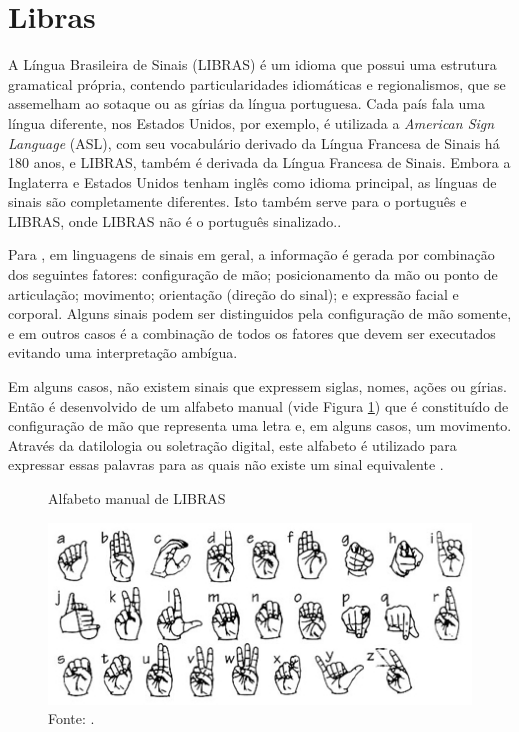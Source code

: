 \section{Libras}

A Língua Brasileira de Sinais (LIBRAS) é um idioma que possui uma estrutura gramatical própria, contendo particularidades 
idiomáticas e regionalismos, que se assemelham ao sotaque ou as gírias da língua portuguesa. Cada país fala uma língua diferente, 
nos Estados Unidos, por exemplo, é utilizada a \textit{American Sign Language} (ASL), com seu vocabulário derivado da Língua 
Francesa de Sinais há 180 anos, e LIBRAS, também é derivada da Língua Francesa de Sinais. Embora a Inglaterra e Estados Unidos tenham inglês como idioma principal, as 
línguas de sinais são completamente diferentes. Isto também serve para o português e LIBRAS, onde LIBRAS não é o português 
sinalizado.\cite{Comunicacao}.

Para , em linguagens de sinais em geral, a informação é gerada por combinação dos seguintes fatores: 
configuração de mão; posicionamento da mão ou ponto de articulação; movimento; orientação (direção do sinal); e expressão facial e 
corporal.
Alguns sinais podem ser distinguidos pela configuração de mão somente, e em outros casos é a combinação de todos os fatores que 
devem ser executados evitando uma interpretação ambígua.

Em alguns casos, não existem sinais que expressem siglas, nomes, ações ou gírias. Então é desenvolvido de um alfabeto manual 
(vide Figura \ref{fig:alfabeto}) que é constituído de configuração de mão que representa uma letra e, em alguns casos, um 
movimento. Através da datilologia ou soletração digital, este alfabeto é utilizado para expressar essas palavras para as quais não 
existe um sinal equivalente  \cite{PorUmaGramatica}.


\begin{figure}[H]
	\centering
	\vspace{4mm}
	\caption{Alfabeto manual de LIBRAS}
	\label{fig:alfabeto}
	\includegraphics[scale =0.5]{imagens/Alfabeto_Libras.jpeg}
	\caption*{Fonte: .}
\end{figure}


